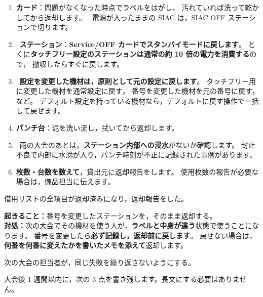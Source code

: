 \begin{enumerate}
\item \textbf{カード}：問題がなくなった時点でラベルをはがし，
      汚れていれば洗って乾かしてから返却します。
      \tSIAC\ 電源が入ったままの SIAC は，SIAC OFF ステーションで切ります。
\item \tSI\ \textbf{ステーション}：\textbf{Service/OFF カードでスタンバイモードに戻します}。
      とくに\textbf{タッチフリー設定のステーションは通常の約 10 倍の電力を消費する}ので，
      撤収したらすぐに戻します。
\item \tSI\ \textbf{設定を変更した機材は，原則として元の設定に戻します}。
      タッチフリー用に変更した機材を通常設定に戻す，
      番号を変更した機材を元の番号に戻す，など。
      デフォルト設定を持っている機材なら，デフォルトに戻す操作で一括して戻せます。
\item \textbf{パンチ台}：泥を洗い流し，拭いてから返却します。
\item \tSI\ 雨の大会のあとは，\textbf{ステーション内部への浸水}がないか確認します。
      封止不良で内部に水滴が入り，パンチ時刻が不正に記録された事例があります。
\item \textbf{枚数・台数を数えて}，貸出元に返却報告をします。
      使用枚数の報告が必要な場合は，備品担当に伝えます。
\end{enumerate}

\begin{Done}
借用リストの全項目が返却済みになり，返却報告をした。
\end{Done}

\begin{Fail}
\textbf{起きること：}番号を変更したステーションを，そのまま返却する。\\
\textbf{対処：}次の大会でその機材を使う人が，\textbf{ラベルと中身が違う}状態で使うことになります。
番号を変更したら\textbf{必ず記録し，返却前に戻します}。
戻せない場合は，\textbf{何番を何番に変えたかを書いたメモを添えて}返却します。
\end{Fail}


\begin{Goal}
次の大会の担当者が，同じ失敗を繰り返さないようにする。
\end{Goal}

大会後 1 週間以内に，次の 3 点を書き残します。長文にする必要はありません。

